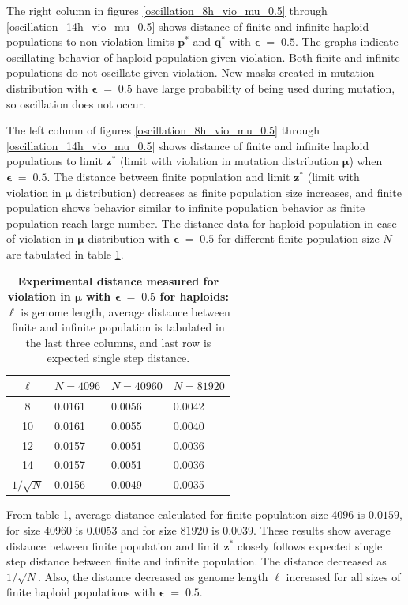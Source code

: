 \clearpage

The right column in figures \ref{oscillation_8h_vio_mu_0.5} through \ref{oscillation_14h_vio_mu_0.5} 
shows distance of finite and infinite haploid populations to non-violation limits $\bm{p^\ast}$ and $\bm{q^\ast}$ with $\bm{\epsilon} \;=\; 0.5$. 
The graphs indicate oscillating behavior of haploid population given violation. 
Both finite and infinite populations do not oscillate given violation. 
New masks created in mutation distribution with $\bm{\epsilon} \;=\; 0.5$ have large probability 
of being used during mutation, so oscillation does not occur.

The left column of figures \ref{oscillation_8h_vio_mu_0.5} through \ref{oscillation_14h_vio_mu_0.5} 
shows distance of finite and infinite haploid populations to limit $\bm{z^\ast}$ 
(limit with violation in mutation distribution $\bm{\mu}$) when $\bm{\epsilon} \;=\; 0.5$. 
The distance between finite population and limit $\bm{z}^\ast$ (limit with violation in $\bm{\mu}$ distribution) 
decreases as finite population size increases, 
and finite population shows behavior similar to infinite population behavior as finite population reach large number. 
The distance data for haploid population in case of violation in $\bm{\mu}$ distribution 
with $\bm{\epsilon} \;=\; 0.5$ for different finite population size $N$ are tabulated in table \ref{distanceMuHapEps0.5}.

\begin{table}[ht]
\caption{\textbf{Experimental distance measured for violation in $\bm{\mu}$ with $\bm{\epsilon} \;=\; 0.5$ for haploids:} $\ell$ is genome length, 
average distance between finite and infinite population is tabulated in the last three columns, and last row is expected single step distance.}
\centering
\begin{tabularx}{0.75\textwidth}{ c *{3}{X}}
\toprule
$\ell$ & $N = 4096$ & $N = 40960$ & $N = 81920$ \\
\midrule
8 & 0.0161	&  0.0056	& 0.0042 \\
10 & 0.0161	&  0.0055	& 0.0040 \\
12 & 0.0157	&  0.0051	& 0.0036 \\
14 & 0.0157	&  0.0051	& 0.0036 \\
\midrule
$1/\sqrt{N}$ & 0.0156 & 0.0049 & 0.0035 \\
\bottomrule
\end{tabularx}
\label{distanceMuHapEps0.5}
\end{table}
 
From table \ref{distanceMuHapEps0.5}, average distance calculated for finite population size $4096$ is $0.0159$, 
for size $40960$ is $0.0053$ and for size $81920$ is $0.0039$. These results show average distance 
between finite population and limit $\bm{z^\ast}$ closely follows expected single step distance 
between finite and infinite population. The distance decreased as $1/\sqrt{N}$. 
Also, the distance decreased as genome length $\ell$ increased for all sizes of finite haploid populations 
with $\bm{\epsilon} \;=\; 0.5$.